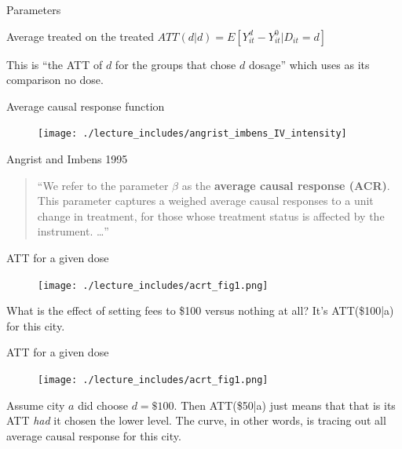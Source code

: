 \documentclass{beamer}
\begin{document}
\begin{frame}{Parameters}

\begin{block}{Average treated on the treated}
$ATT(d|d) = E[Y^d_{it} - Y^0_{it} | D_{it}=d]$
\end{block}

\bigskip

This is ``the ATT of $d$ for the groups that chose $d$ dosage'' which uses as its comparison no dose.

\end{frame}

\begin{frame}{Average causal response function}

\begin{figure}
\begin{center}
             \texttt{[image: ./lecture\_includes/angrist\_imbens\_IV\_intensity]}
\end{center}
\end{figure}

\end{frame}


\begin{frame}{Angrist and Imbens 1995}

\begin{quote}
``We refer to the parameter $\beta$ as the \textbf{average causal response (ACR)}. This parameter captures a weighed average causal responses to a unit change in treatment, for those whose treatment status is affected by the instrument. \dots ''
\end{quote}

\end{frame}


\begin{frame}{ATT for a given dose}

\begin{figure}
\begin{center}
             \texttt{[image: ./lecture\_includes/acrt\_fig1.png]}
\end{center}
\end{figure}

What is the effect of setting fees to \$100 versus nothing at all? It's ATT(\$100|a) for this city.


\end{frame}

\begin{frame}{ATT for a given dose}

\begin{figure}
\begin{center}
             \texttt{[image: ./lecture\_includes/acrt\_fig1.png]}
\end{center}
\end{figure}

Assume city $a$ did choose $d=\$100$. Then ATT(\$50|a) just means that that is its ATT \emph{had} it chosen the lower level.  The curve, in other words, is tracing out all average causal response for this city.


\end{frame}
\end{document}
